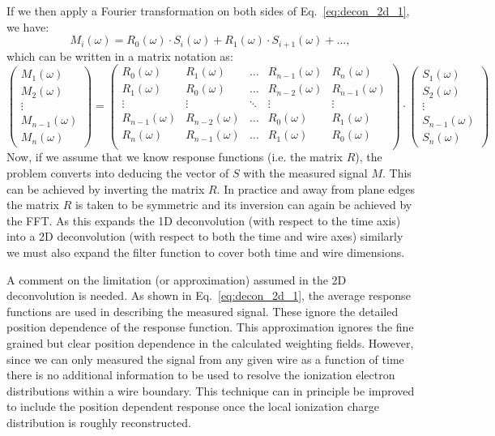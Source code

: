 If we then apply a Fourier transformation on both sides of Eq.~\ref{eq:decon_2d_1},
we have:
\begin{equation}\label{eq:decon_2d_2}
M_i(\omega) = R_0(\omega) \cdot S_i(\omega) + R_1(\omega) \cdot S_{i+1} (\omega) + ...,
\end{equation} 
which can be written in a matrix notation as:
\begin{equation}
\begin{pmatrix}
    M_1(\omega)\\
    M_2(\omega)\\
    \vdots\\
    M_{n-1}(\omega)\\
    M_{n}(\omega)
\end{pmatrix}
=
\begin{pmatrix}
R_0(\omega) & R_1(\omega) & \ldots & R_{n-1}(\omega) & R_n(\omega) \\
R_1(\omega) & R_0(\omega) & \ldots & R_{n-2}(\omega) & R_{n-1}(\omega) \\
    \vdots  & \vdots      & \ddots & \vdots          & \vdots \\
    R_{n-1}(\omega) & R_{n-2}(\omega) & \ldots & R_0(\omega) & R_1(\omega) \\
    R_{n}(\omega) & R_{n-1}(\omega) & \ldots & R_1(\omega) & R_0(\omega) \\
\end{pmatrix}
\cdot
\begin{pmatrix}
    S_1(\omega)\\
    S_2(\omega)\\
    \vdots\\
    S_{n-1}(\omega)\\
    S_{n}(\omega)
\end{pmatrix}
\label{eq:matrix_expansion}
\end{equation}
Now, if we assume that we know response functions (i.e. the matrix $R$), the 
problem converts into deducing the vector of $S$ with the measured signal $M$. 
%
This can be achieved by inverting the matrix $R$. In practice and away
from plane edges the matrix $R$ is taken to be symmetric and its
inversion can again be achieved by the FFT.
%
As this expands the 1D deconvolution (with respect to the time axis)
into a 2D deconvolution (with respect to both the time and wire
axes) similarly we must also expand the filter function to cover
both time and wire dimensions.

A comment on the limitation (or approximation) 
assumed in the 2D deconvolution is needed. As shown in Eq.~\ref{eq:decon_2d_1}, the 
average response functions are used in describing the measured signal. These 
ignore the detailed position dependence of the response function. 
This approximation ignores the fine grained but clear position
dependence in the calculated weighting fields.
However, since we can only measured the signal from any given wire as
a function of time there is no additional information to be used to
resolve the ionization electron distributions within a wire boundary.
This technique can in principle be improved to include the position dependent
response once the local ionization charge distribution is roughly reconstructed. 


